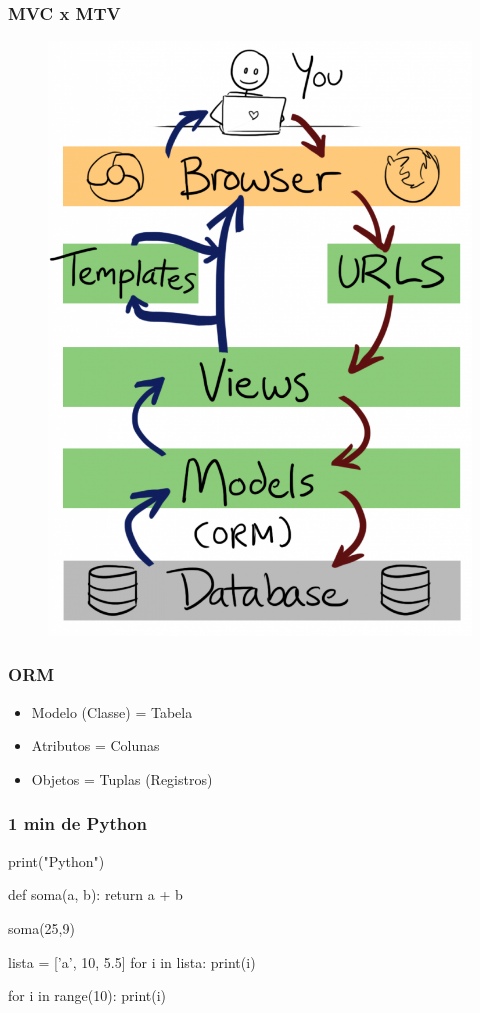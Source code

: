 \documentclass[aspectratio=169]{beamer}
\begin{document}
\begin{frame}\frametitle{MVC x MTV}
	\begin{figure}[h]
	  \centering
  		\includegraphics[height=.9\paperheight]{img/mtv2.png}
	\end{figure}
\end{frame}


\begin{frame}\frametitle{ORM}

\begin{itemize}
	\item Modelo (Classe) = Tabela
	\item Atributos = Colunas
	\item Objetos = Tuplas (Registros)
\end{itemize}

\end{frame}

\begin{frame}[fragile]\frametitle{1 min de Python}

\begin{pythoncode}
    print("Python")

    def soma(a, b):
        return a + b

    soma(25,9)

    lista = ['a', 10, 5.5]
    for i in lista:
        print(i)

    for i in range(10):
        print(i)

\end{pythoncode}

\end{frame}
\end{document}
